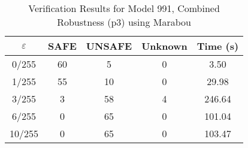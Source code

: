 \begin{table}[htbp]
\centering
\caption{Verification Results for Model 991, Combined Robustness (p3) using Marabou}
\label{tab:model991_p3_marabou}
\begin{tabular}{|c|c|c|c|c|}
\hline
$\varepsilon$ & SAFE & UNSAFE & Unknown & Time (s) \\ \hline
0/255 & 60 & 5 & 0 & 3.50 \\ \hline
1/255 & 55 & 10 & 0 & 29.98 \\ \hline
3/255 & 3 & 58 & 4 & 246.64 \\ \hline
6/255 & 0 & 65 & 0 & 101.04 \\ \hline
10/255 & 0 & 65 & 0 & 103.47 \\ \hline
\end{tabular}
\end{table}
